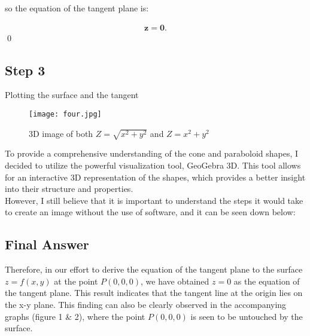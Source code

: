 \documentclass[english]{article}
\begin{document}
\noindent so the equation of the tangent plane is:

\begin{align*}
    \mathbf{z = 0}.
\end{align*}
\qed

\subsection{Step 3}
Plotting the surface and the tangent

    \begin{figure}[H]
    \centering
    \texttt{[image: four.jpg]}
    \caption*{3D image of both $Z = \sqrt{x^2 + y^2}$ and $Z = x^2 + y^2$}
\end{figure}



To provide a comprehensive understanding of the cone and paraboloid shapes, I decided to utilize the powerful visualization tool, GeoGebra 3D. This tool allows for an interactive 3D representation of the shapes, which provides a better insight into their structure and properties. 
\\
However, I still believe that it is important to understand the steps it would take to create an image without the use of software, and it can be seen down below:

\subsection{Final Answer}
Therefore, in our effort to derive the equation of the tangent plane to the surface $z=f(x,y)$ at the point $P(0,0,0)$, we have obtained $z=0$ as the equation of the tangent plane. This result indicates that the tangent line at the origin lies on the x-y plane. This finding can also be clearly observed in the accompanying graphs (figure 1 \& 2), where the point $P(0,0,0)$ is seen to be untouched by the surface.

\end{document}
